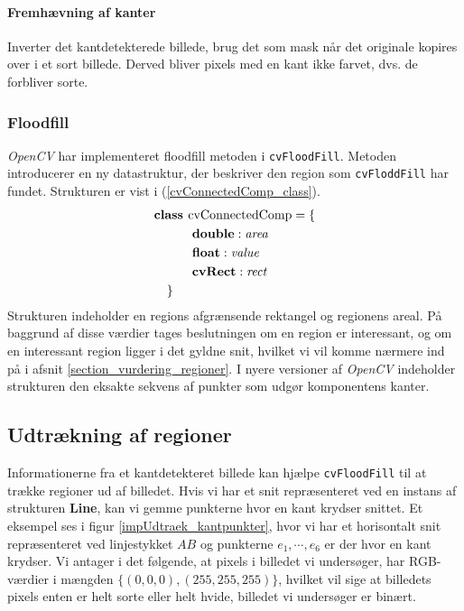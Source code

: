 {\paragraph{Fremhævning af kanter}
Inverter det kantdetekterede billede, brug det som mask når det
originale kopires over i et sort billede. Derved bliver pixels med en
kant ikke farvet, dvs. de forbliver sorte.

\subsubsection{Floodfill}
\emph{OpenCV} har implementeret floodfill metoden i
\texttt{cvFloodFill}. Metoden introducerer en ny datastruktur, der
beskriver den region som \texttt{cvFloddFill} har fundet. Strukturen er
vist i (\ref{cvConnectedComp_class}).
\begin{multline}
    \textbf{class~} \textrm{cvConnectedComp} = \{ \\
    \shoveleft{\qquad\textbf{double} : \textit{area}} \\
    \shoveleft{\qquad\textbf{float} : \textit{value}} \\
    \shoveleft{\qquad\textbf{cvRect} : \textit{rect}} \\
    \shoveleft{\}}\shoveright{}
    \label{cvConnectedComp_class}
\end{multline}
Strukturen indeholder en regions afgrænsende rektangel og regionens
areal.  På baggrund af disse værdier tages beslutningen om en region er
interessant, og om en interessant region ligger i det gyldne snit,
hvilket vi vil komme nærmere ind på i afsnit
\ref{section_vurdering_regioner}.  I nyere versioner af \emph{OpenCV}
indeholder strukturen den eksakte sekvens af punkter som udgør
komponentens kanter.

\subsection{Udtrækning af regioner}
Informationerne fra et kantdetekteret billede kan hjælpe
\texttt{cvFloodFill} til at trække regioner ud af billedet. Hvis vi har
et snit repræsenteret ved en instans af strukturen \textbf{Line}, kan vi
gemme punkterne hvor en kant krydser snittet. Et eksempel ses i figur
\ref{impUdtraek_kantpunkter}, hvor vi har et horisontalt snit
repræsenteret ved linjestykket $AB$ og punkterne $e_1, \cdots, e_6$ er
der hvor en kant krydser. Vi antager i det følgende, at pixels i
billedet vi undersøger, har RGB-værdier i mængden
$\{(0,0,0),(255,255,255)\}$, hvilket vil sige at billedets pixels enten
er helt sorte eller helt hvide, billedet vi undersøger er binært.

}
